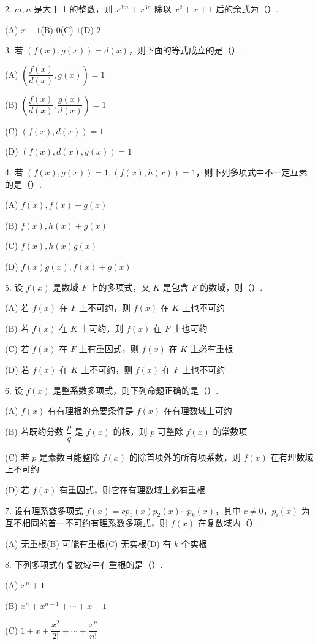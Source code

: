 \documentclass[UTF8,12pt,a4paper,fontset=fandol]{ctexart}
\begin{document}
2. $m,n$ 是大于 1 的整数，则 $x^{3m}+x^{3n}$ 除以 $x^2+x+1$ 后的余式为（\quad ）.

(A) $x+1$\quad (B) $0$\quad (C) $1$\quad (D) $2$

3. 若 $(f(x),g(x))=d(x)$，则下面的等式成立的是（\quad ）.

(A) $\left(\dfrac{f(x)}{d(x)},g(x)\right)=1$

(B) $\left(\dfrac{f(x)}{d(x)},\dfrac{g(x)}{d(x)}\right)=1$

(C) $(f(x),d(x))=1$

(D) $(f(x),d(x),g(x))=1$

4. 若 $(f(x),g(x))=1,(f(x),h(x))=1$，则下列多项式中不一定互素的是（\quad ）.

(A) $f(x),f(x)+g(x)$

(B) $f(x),h(x)+g(x)$

(C) $f(x),h(x)g(x)$

(D) $f(x)g(x),f(x)+g(x)$

5. 设 $f(x)$ 是数域 $F$ 上的多项式，又 $K$ 是包含 $F$ 的数域，则（\quad ）.

(A) 若 $f(x)$ 在 $F$ 上不可约，则 $f(x)$ 在 $K$ 上也不可约

(B) 若 $f(x)$ 在 $K$ 上可约，则 $f(x)$ 在 $F$ 上也可约

(C) 若 $f(x)$ 在 $F$ 上有重因式，则 $f(x)$ 在 $K$ 上必有重根

(D) 若 $f(x)$ 在 $K$ 上不可约，则 $f(x)$ 在 $F$ 上也不可约

6. 设 $f(x)$ 是整系数多项式，则下列命题正确的是（\quad ）.

(A) $f(x)$ 有有理根的充要条件是 $f(x)$ 在有理数域上可约

(B) 若既约分数 $\dfrac{p}{q}$ 是 $f(x)$ 的根，则 $p$ 可整除 $f(x)$ 的常数项

(C) 若 $p$ 是素数且能整除 $f(x)$ 的除首项外的所有项系数，则 $f(x)$ 在有理数域上不可约

(D) 若 $f(x)$ 有重因式，则它在有理数域上必有重根

7. 设有理系数多项式 $f(x)=cp_1(x)p_2(x)\cdots p_k(x)$，其中 $c\ne0$，$p_i(x)$ 为互不相同的首一不可约有理系数多项式，则 $f(x)$ 在复数域内（\quad ）.

(A) 无重根\quad (B) 可能有重根\quad (C) 无实根\quad (D) 有 $k$ 个实根

8. 下列多项式在复数域中有重根的是（\quad ）.

(A) $x^n+1$

(B) $x^n+x^{n-1}+\cdots+x+1$

(C) $1+x+\dfrac{x^2}{2!}+\cdots+\dfrac{x^n}{n!}$
\end{document}
